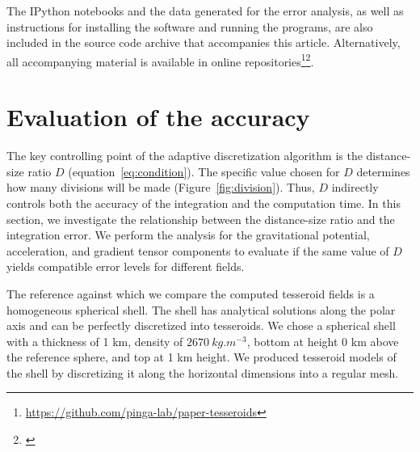 \documentclass[paper,twocolumn,twoside]{geophysics}
\begin{document}
The IPython notebooks
and the data generated for the error analysis,
as well as instructions for installing the software
and running the programs,
are also included in
the source code archive that accompanies this article.
Alternatively,
all accompanying material is available
in online repositories\footnote{
\url{https://github.com/pinga-lab/paper-tesseroids}}\footnote{
\url{}}.



\section{Evaluation of the accuracy}



The key controlling point of the adaptive discretization algorithm
is the distance-size ratio $D$ (equation~\ref{eq:condition}).
The specific value chosen for $D$ determines how many divisions will be made
(Figure~\ref{fig:division}).
Thus, $D$ indirectly controls both the accuracy of the integration
and the computation time.
In this section, we investigate the relationship between
the distance-size ratio and the integration error.
We perform the analysis for the gravitational potential,
acceleration, and gradient tensor components
to evaluate if the same value of $D$ yields compatible error levels
for different fields.


The reference against which we compare the computed tesseroid fields
is a homogeneous spherical shell.
The shell has analytical solutions along the polar axis
\citep{Grombein2013}
and can be perfectly discretized into tesseroids.
We chose a spherical shell with a thickness of 1 km,
density of $2670\ kg.m^{-3}$,
bottom at height 0 km above the reference sphere,
and top at 1 km height.
We produced tesseroid models of the shell by discretizing it along the
horizontal dimensions into a regular mesh.
\end{document}
